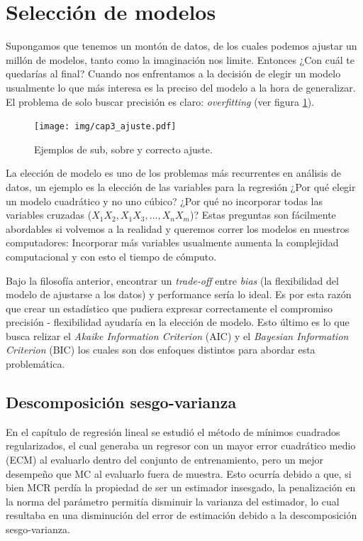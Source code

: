 
\section{Selección de modelos}

Supongamos que tenemos un montón de datos, de los cuales podemos ajustar un millón de modelos, tanto como la imaginación nos limite. Entonces ¿Con cuál te quedarías al final?
Cuando nos enfrentamos a la decisión de elegir un modelo usualmente lo que más interesa es la preciso del modelo a la hora de generalizar. El problema de solo buscar precisión es claro: \emph{overfitting} (ver figura \ref{fig:overfitting}).
\begin{figure}[h!]
    \centering
    \texttt{[image: img/cap3\_ajuste.pdf]}
    \caption{Ejemplos de sub, sobre y correcto ajuste.}
    \label{fig:overfitting}
\end{figure}

La elección de modelo es uno de los problemas más recurrentes en análisis de datos, un ejemplo es la elección de las variables para la regresión ¿Por qué elegir un modelo cuadrático y no uno cúbico? ¿Por qué no incorporar todas las variables cruzadas ($X_1X_2, X_1X_3, ..., X_nX_m$)? Estas preguntas son fácilmente abordables si volvemos a la realidad y queremos correr los modelos en nuestros computadores: Incorporar más variables usualmente aumenta la complejidad computacional y con esto el tiempo de cómputo.

Bajo la filosofía anterior, encontrar un  \textit{trade-off} entre \emph{bias} (la flexibilidad del modelo de ajustarse a los datos) y performance sería lo ideal. Es por esta razón que crear un estadístico que pudiera expresar correctamente el compromiso precisión - flexibilidad ayudaría en la elección de modelo. Esto último es lo que busca relizar el \emph{Akaike Information Criterion} (AIC) y el \emph{Bayesian Information Criterion} (BIC) los cuales son dos enfoques distintos para abordar esta problemática.


\subsection{Descomposición sesgo-varianza}

En el capítulo de regresión lineal se estudió el método de mínimos cuadrados regularizados, el cual generaba un regresor con un mayor error cuadrático medio (ECM) al evaluarlo dentro del conjunto de entrenamiento, pero un mejor desempeño que MC al evaluarlo fuera de muestra. Esto ocurría debido a que, si bien MCR perdía la propiedad de ser un estimador insesgado, la penalización en la norma del parámetro permitía disminuir la varianza del estimador, lo cual resultaba en una disminución del error de estimación debido a la descomposición sesgo-varianza.\\

